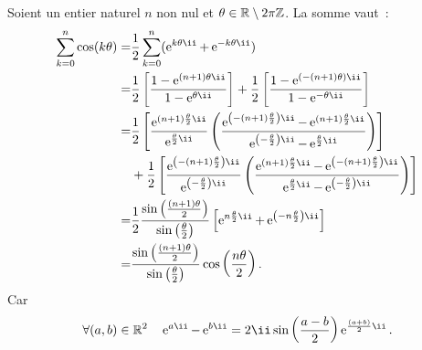 Soient un entier naturel $n$ non nul et $\theta \in \mathbb{R} \setminus 2\pi\mathbb{Z}$. La somme vaut~:
\begin{align} 
  \sum_{k=0}^n \cos(k\theta) =& \frac{1}{2} \sum_{k=0}^n (\expc{}{k \theta} + \expc{}{-k \theta})\\
  =&\frac{1}{2} \left[\frac{1-\expc{}{(n+1)\theta}}{1-\expc{}{\theta}}\right] + \frac{1}{2} \left[\frac{1-\expc{}{(-(n+1) \theta)}}{1-\expc{}{-\theta}}\right]\\
  =&\frac{1}{2} \left[\frac{\expc{}{(n+1) \frac{\theta}{2}}}{\expc{}{\frac{\theta}{2}}} \left(\frac{\expc{}{\left(-(n+1) \frac{\theta}{2}\right)}-\expc{}{(n+1) \frac{\theta}{2}}}{\expc{}{\left(-\frac{\theta}{2}\right)} - \expc{}{\frac{\theta}{2}}} \right)\right] \notag \\
  &+ \frac{1}{2} \left[\frac{\expc{}{\left(-(n+1) \frac{\theta}{2}\right)}}{\expc{}{\left(-\frac{\theta}{2}\right)}} \left(\frac{\expc{}{(n+1) \frac{\theta}{2}}-\expc{}{\left(-(n+1) \frac{\theta}{2}\right)}}{\expc{}{\frac{\theta}{2}} - \expc{}{\left(-\frac{\theta}{2}\right)}} \right)\right] \\
  =& \frac{1}{2} \frac{\sin \left(\frac{(n+1)\theta}{2} \right)}{\sin \left( \frac{\theta}{2} \right)} \left[\expc{}{n \frac{\theta}{2}} +\expc{}{\left(-n \frac{\theta}{2}\right)} \right] \\
  =& \frac{\sin \left(\frac{(n+1)\theta}{2} \right)}{\sin \left( \frac{\theta}{2} \right)} \cos \left( \frac{n\theta}{2} \right).
\end{align}
%
Car
\begin{equation}
  \forall (a,b) \in \R^2 \quad \expc{}{a}-\expc{}{b}=2\ii \sin\left(\frac{a-b}{2}\right)\expc{}{\frac{(a+b)}{2}}.
\end{equation}

